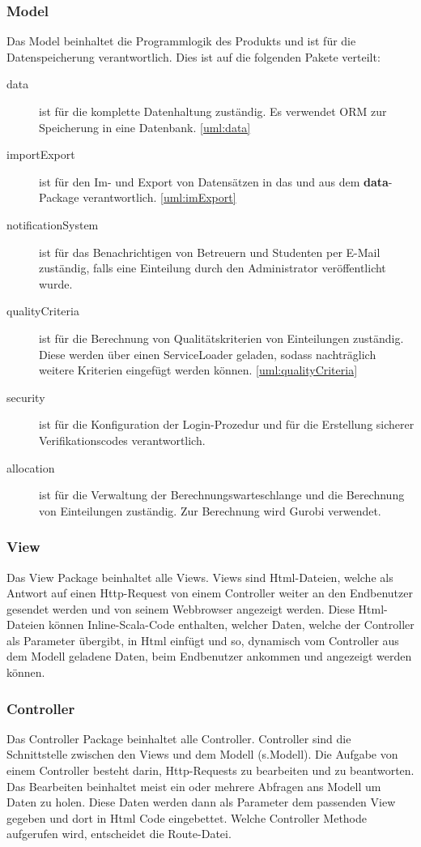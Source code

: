 \documentclass[parskip=full]{scrartcl}
\begin{document}
\subsubsection{Model}
Das Model beinhaltet die Programmlogik des Produkts und ist für die
Datenspeicherung verantwortlich. Dies ist auf die folgenden Pakete
verteilt:
\begin{description}
\item[data] ist für die komplette Datenhaltung zuständig. Es verwendet ORM zur
Speicherung in eine Datenbank. \autoref{uml:data}
\item[importExport] ist für den Im- und Export von Datensätzen in das und aus dem
\textsf{\textbf{data}}-Package verantwortlich. \autoref{uml:imExport}
\item[notificationSystem] ist für das Benachrichtigen von Betreuern und
Studenten per E-Mail zuständig, falls eine Einteilung durch den Administrator
veröffentlicht wurde. %
\item[qualityCriteria] ist für die Berechnung von Qualitätskriterien von
Einteilungen zuständig. Diese werden über einen ServiceLoader geladen, sodass
nachträglich weitere Kriterien eingefügt werden können.
\autoref{uml:qualityCriteria}
\item[security] ist für die Konfiguration der Login-Prozedur und für die
Erstellung sicherer Verifikationscodes verantwortlich.
\item[allocation] ist für die Verwaltung der Berechnungswarteschlange und die
Berechnung von Einteilungen zuständig. Zur Berechnung wird Gurobi verwendet.
\end{description}

   \subsubsection{View}
   Das View Package beinhaltet alle Views. Views sind Html-Dateien, welche als
   Antwort auf einen Http-Request von einem Controller weiter an den Endbenutzer gesendet werden und von seinem Webbrowser angezeigt werden. Diese Html-Dateien können Inline-Scala-Code enthalten, welcher Daten, welche der Controller als Parameter übergibt, in Html einfügt und so, dynamisch vom Controller aus dem Modell geladene Daten, beim Endbenutzer ankommen und angezeigt werden können.
\subsubsection{Controller}
Das Controller Package beinhaltet alle Controller. Controller sind die Schnittstelle zwischen den Views und dem Modell (s.Modell). Die Aufgabe von einem Controller besteht darin, Http-Requests zu bearbeiten und zu beantworten. Das Bearbeiten beinhaltet meist ein oder mehrere Abfragen ans Modell um Daten zu holen. Diese Daten werden dann als Parameter dem passenden View gegeben und dort in Html Code eingebettet. Welche Controller Methode aufgerufen wird, entscheidet die Route-Datei.
\end{document}
